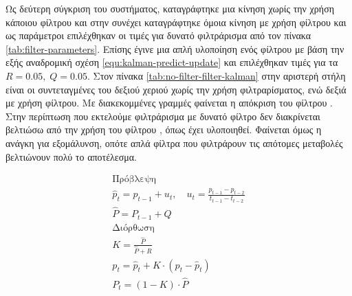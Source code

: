 Ως δεύτερη σύγκριση του συστήματος, καταγράφτηκε μια κίνηση χωρίς την χρήση κάποιου φίλτρου και στην συνέχει καταγράφτηκε όμοια κίνηση με χρήση φίλτρου και ως παράμετροι επιλέχθηκαν οι τιμές για δυνατό φιλτράρισμα από τον πίνακα \ref{tab:filter-parameters}. Επίσης έγινε μια απλή υλοποίηση ενός φίλτρου  με βάση την εξής αναδρομική σχέση \ref{equ:kalman-predict-update} και επιλέχθηκαν τιμές για τα $R = 0.05,\; Q = 0.05$. Στον πίνακα \ref{tab:no-filter-filter-kalman} στην αριστερή στήλη είναι οι συντεταγμένες του δεξιού χεριού χωρίς την χρήση φιλτραρίσματος, ενώ δεξιά με χρήση φίλτρου. Με διακεκομμένες γραμμές φαίνεται η απόκριση του φίλτρου . Στην περίπτωση που εκτελούμε φιλτράρισμα με δυνατό φίλτρο δεν διακρίνεται βελτιώσω από την χρήση του φίλτρου , όπως έχει υλοποιηθεί. Φαίνεται όμως η ανάγκη για εξομάλυνση, οπότε απλά φίλτρα που φιλτράρουν τις απότομες μεταβολές βελτιώνουν πολύ το αποτέλεσμα.

\begin{equation}
    \begin{gathered}
        \text{Πρόβλεψη} \\
        \hat{p}_{t} = p_{t-1} + u_{t}, \quad u_{t} = \frac{p_{t-1} - p_{t-2}}{t_{t-1} - t_{t-2}} \\
        \hat{P} = P_{t-1} + Q \\[.5cm]
        \text{Διόρθωση} \\
        Κ = \frac{\hat{P}}{\hat{P} + R}\\
        p_{t} = \hat{p}_{t} + K \cdot (p_{t} - \hat{p}_{t}) \\
        P_{t} = (1 - K) \cdot \hat{P}
    \end{gathered}
    \label{equ:kalman-predict-update}
\end{equation}

